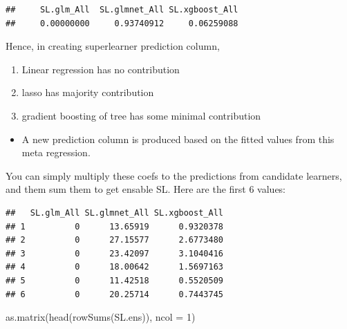 \documentclass[
]{book}
\newenvironment{Shaded}{\begin{snugshade}}{\end{snugshade}}
\newcommand{\AttributeTok}[1]{\textcolor[rgb]{0.77,0.63,0.00}{#1}}
\newcommand{\DecValTok}[1]{\textcolor[rgb]{0.00,0.00,0.81}{#1}}
\newcommand{\FunctionTok}[1]{\textcolor[rgb]{0.00,0.00,0.00}{#1}}
\newcommand{\NormalTok}[1]{#1}
\newcommand{\OtherTok}[1]{\textcolor[rgb]{0.56,0.35,0.01}{#1}}
\newcommand{\SpecialCharTok}[1]{\textcolor[rgb]{0.00,0.00,0.00}{#1}}
\providecommand{\tightlist}{%
  \setlength{\itemsep}{0pt}\setlength{\parskip}{0pt}}
\begin{document}
\begin{verbatim}
##     SL.glm_All  SL.glmnet_All SL.xgboost_All 
##     0.00000000     0.93740912     0.06259088
\end{verbatim}

Hence, in creating superlearner prediction column,

\begin{enumerate}
\def\labelenumi{\alph{enumi}.}
\tightlist
\item
  Linear regression has no contribution
\item
  lasso has majority contribution
\item
  gradient boosting of tree has some minimal contribution
\end{enumerate}

\begin{itemize}
\tightlist
\item
  A new prediction column is produced based on the fitted values from this meta regression.
\end{itemize}

You can simply multiply these coefs to the predictions from candidate learners, and them sum them to get ensable SL. Here are the first 6 values:

\begin{Shaded}
\end{Shaded}

\begin{verbatim}
##   SL.glm_All SL.glmnet_All SL.xgboost_All
## 1          0      13.65919      0.9320378
## 2          0      27.15577      2.6773480
## 3          0      23.42097      3.1040416
## 4          0      18.00642      1.5697163
## 5          0      11.42518      0.5520509
## 6          0      20.25714      0.7443745
\end{verbatim}

\begin{Shaded}
\begin{Highlighting}[]
\FunctionTok{as.matrix}\NormalTok{(}\FunctionTok{head}\NormalTok{(}\FunctionTok{rowSums}\NormalTok{(SL.ens)), }\AttributeTok{ncol =} \DecValTok{1}\NormalTok{)}
\end{Highlighting}
\end{Shaded}
\end{document}
